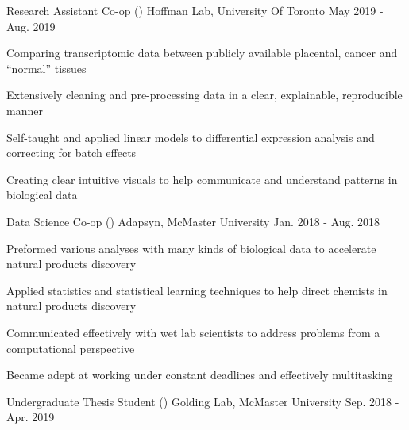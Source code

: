 \begin{cventries}
    \cventry
    {Research Assistant Co-op ()}
      {Hoffman Lab, University Of Toronto}
      {May 2019 - Aug. 2019}
      {}%
      {
        \begin{cvitems}
         \item {Comparing transcriptomic data between publicly available placental, cancer and ``normal'' tissues}
         \item {Extensively cleaning and pre-processing data in a clear, explainable, reproducible manner}
         \item {Self-taught and applied linear models to differential expression analysis and correcting for batch effects}
         \item {Creating clear intuitive visuals to help communicate and understand patterns in biological data}
        \end{cvitems}
      }
    \cventry
      {Data Science Co-op ()}
      {Adapsyn, McMaster University}
      {Jan. 2018 - Aug. 2018}
      {}%
      {
        \begin{cvitems}
         \item {Preformed various analyses with many kinds of biological data to accelerate natural products discovery}
         \item {Applied statistics and statistical learning techniques to help direct chemists in natural products discovery}
         \item {Communicated effectively with wet lab scientists to address problems from a computational perspective}
         \item {Became adept at working under constant deadlines and effectively multitasking}
        \end{cvitems}
      }
    \cventry
      {Undergraduate Thesis Student ()}
      {Golding Lab, McMaster University}
      {Sep. 2018 - Apr. 2019}
      {}%

\end{cventries}
